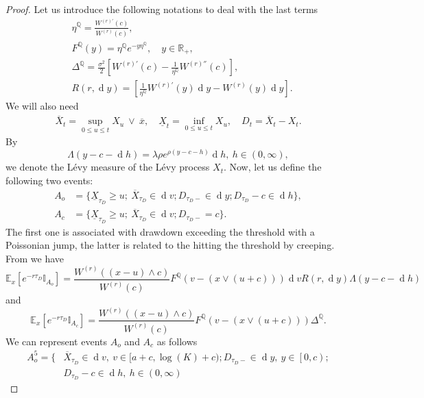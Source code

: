 \documentclass[10pt]{amsart}
\def\E{{\mathbb{E}}}
\def\Q{{\mathbb{Q}}}
\def \R{{{\rm I{\!}\rm R}}}
\def \I{{\mathbb{I}}}
\newcommand{\dx}{\operatorname{d}\!}
\def\E{{\mathbb E}} \def\PP{\mc P} \def\Z{{\mathbb Z}} \def\R{{\mathbb R}}
\begin{document}
\begin{proof}
			
			Let us introduce the following notations to deal with the last terms
			\begin{align}
				&\eta^\Q = \frac{W^{(r)'}(c)}{W^{(r)}(c)}, \label{def_eta} \\
				\nonumber &F^\Q(y) = \eta^\Q e^{-y\eta^\Q},\quad y \in \mathbb{R}_+,  \\
				&\Delta^\Q = \frac{\sigma^2}{2}\left[ W^{(r)'}(c) - \frac{1}{\eta^{\Q}}W^{(r)''}(c) \right], \label{def_Delta} \\
				\nonumber &R(r,\dx y) = \left[\frac{1}{\eta^{\Q}} W^{(r)'}(y)\dx y - W^{(r)}(y)\dx y \right].
			\end{align}
			We will also need
			\begin{align*}
				\overline{X}_t =  \sup_{0 \leq u \leq t} X_u \ \vee\ \overline{x},  \quad
				\underline{X}_t =  \inf_{0 \leq u \leq t} X_u, \quad
				D_t = \overline{X}_t - X_t.
			\end{align*}
			By
			\begin{equation*}
				\Lambda(y-c-\dx h) = \lambda\rho e^{\rho(y-c-h)}\dx h, \ h \in (0, \infty),
			\end{equation*}
			we denote the L\'evy measure of the L\'evy process $X_t$.		
			Now, let us define the following two events:
			\begin{align*}
				A_o &= \{ \underline{X}_{\tau_D} \geq u;\ \overline{X}_{\tau_D} \in \dx v; D_{\tau_D-} \in \dx y; D_{\tau_D} - c \in \dx h \}, \\
				A_c &= \{ \underline{X}_{\tau_D} \geq u;\ \overline{X}_{\tau_D} \in \dx v; D_{\tau_D-} = c \}.
			\end{align*}
			The first one is associated with drawdown exceeding the threshold with a Poissonian jump, the latter is related to the hitting the threshold by creeping. From \cite[eq. (3.10, 3.11)]{MP} we have
			\begin{equation*}
				\E_x \left[ e^{-r\tau_D} \I_{A_o}\right] = \frac{W^{(r)} ((x-u)\wedge c)}{W^{(r)}(c)}F^\Q(v - (x\vee (u+c)))\dx v R(r,\dx y)	\Lambda(y-c-\dx h)
			\end{equation*}
and
			\begin{equation*}
				\E_x \left[ e^{-r\tau_D} \I_{A_c}\right] = \frac{W^{(r)} ((x-u)\wedge c)}{W^{(r)}(c)}F^\Q(v - (x\vee (u+c)))\Delta^\Q.
			\end{equation*}		
			We can represent events $A_o$ and $A_c$ as follows
			\begin{align*}
				A_o^5 = \{& \overline{X}_{\tau_D} \in \dx v,\ v \in [a+c, \log(K) +c); D_{\tau_D-} \in \dx y,\ y \in \left[ 0,c \right); \\ \nonumber & D_{\tau_D} - c \in \dx h,\ h \in (0, \infty)

\end{align*}
\end{proof}
\end{document}
